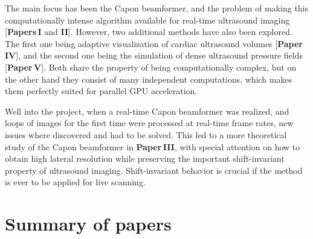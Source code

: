 The main focus has been the Capon beamformer, and the problem of making this computationally intense algorithm available for real-time ultrasound imaging [\textbf{Papers\,I} and \textbf{II}]. However, two additional methods have also been explored. The first one being adaptive visualization of cardiac ultrasound volumes [\textbf{Paper\,IV}], and the second one being the simulation of dense ultrasound pressure fields [\textbf{Paper\,V}]. Both share the property of being computationally complex, but on the other hand they consist of many independent computations, which makes them perfectly suited for parallel GPU acceleration.

Well into the project, when a real-time Capon beamformer was realized, and loops of images for the first time were processed at real-time frame rates, new issues where discovered and had to be solved. This led to a more theoretical study of the Capon beamformer in \textbf{Paper\,III}, with special attention on how to obtain high lateral resolution while preserving the important shift-invariant property of ultrasound imaging. Shift-invariant behavior is crucial if the method is ever to be applied for live scanning. 



\section{Summary of papers}

